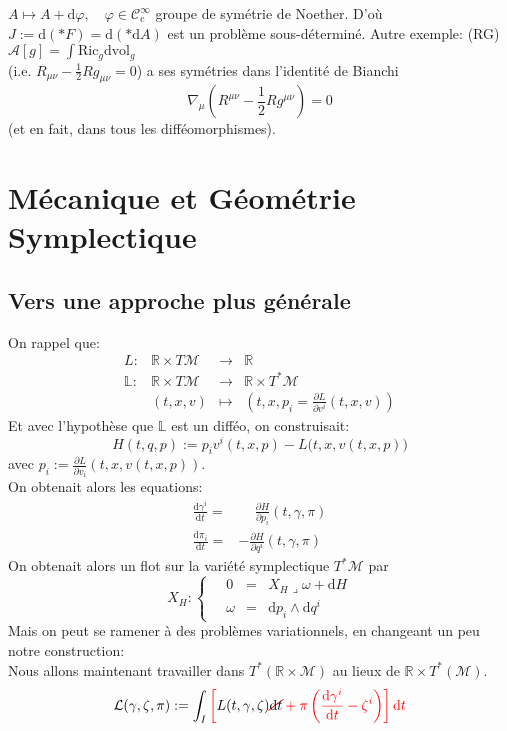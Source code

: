 \documentclass[a4paper,11pt]{article}
\renewcommand{\d}{{\mathrm{d}}}
\newcommand{\dr}[2]{\frac{\partial {#1}}{\partial{#2}}}
\begin{document}
$A\mapsto A+\d \varphi,\quad \varphi\in \mathcal{C}^\infty_\mathrm{c}$ groupe de symétrie de Noether. D'où $J:=\d (*F) = \d (*\d A)$ est un problème sous-déterminé.
Autre exemple: (RG) $\mathcal{A}[g] = \int \mathrm{Ric}_g \d\mathrm{vol}_g$\\
(i.e. $R_{\mu\nu}-\frac{1}{2}Rg_{\mu\nu} = 0$) a ses symétries dans l'identité de Bianchi
$$\nabla_\mu \left(R^{\mu\nu}-\frac{1}{2}Rg^{\mu\nu}\right)=0$$
(et en fait, dans tous les difféomorphismes).

\section{Mécanique et Géométrie Symplectique}
\subsection{Vers une approche plus générale}
On rappel que:
$$\begin{matrix}
L: & \mathbb{R}\times T\mathcal{M} & \to & \mathbb{R}\\
\mathbb{L}: &  \mathbb{R}\times T\mathcal{M} & \to & \mathbb{R}\times T^*\mathcal{M}\\
& (t,x,v) &\mapsto &\left(t,x, p_i = \dr L{v^i}(t,x,v)\right)
\end{matrix}$$
Et avec l'hypothèse que $\mathbb{L}$ est un difféo, on construisait:
$$H(t,q,p):=p_iv^i(t,x,p)-L\big(t,x,v(t,x,p)\big)$$
avec $p_i:= \dr L{v_i}(t,x,v(t,x,p))$.\\
On obtenait alors les equations:
\begin{align*}
\frac{\d \gamma^i}{\d t} =& \quad \, \dr H{p_i}(t,\gamma, \pi)\\
\frac{\d \pi_i}{\d t} =& - \dr H{q^i}(t,\gamma, \pi)
\end{align*}
On obtenait alors un flot sur la variété symplectique $T^*\mathcal{M}$ par
$$X_H : \left\{\quad \begin{matrix}
0 & = & X_H \lrcorner \omega + \d H\\
\omega & = & \d p_i \wedge \d q^i
\end{matrix}\right.$$
Mais on peut se ramener à des problèmes variationnels, en changeant un peu notre construction:\\
Nous allons maintenant travailler dans $T^*(\mathbb{R}\times\mathcal{M})$ au lieux de $\mathbb{R}\times T^*(\mathcal{M})$.
$$\mathcal{L}(\gamma,\zeta,\pi) := \int_I \color{red}\left[\color{black}L(t,\gamma,\zeta) \color{red}\cancel{\color{black}\d  t} + \pi \left( \frac{\d \gamma^i}{\d t} - \zeta^i\right)\right]\d t$$
\end{document}
